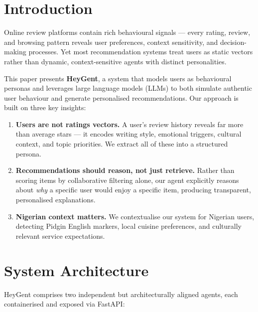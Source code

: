 \documentclass[11pt, a4paper]{article}
\begin{document}
\section{Introduction}

Online review platforms contain rich behavioural signals --- every rating, review, and browsing pattern reveals user preferences, context sensitivity, and decision-making processes. Yet most recommendation systems treat users as static vectors rather than dynamic, context-sensitive agents with distinct personalities.

This paper presents \textbf{HeyGent}, a system that models users as behavioural personas and leverages large language models (LLMs) to both simulate authentic user behaviour and generate personalised recommendations. Our approach is built on three key insights:

\begin{enumerate}[leftmargin=2em]
    \item \textbf{Users are not ratings vectors.} A user's review history reveals far more than average stars --- it encodes writing style, emotional triggers, cultural context, and topic priorities. We extract all of these into a structured persona.
    \item \textbf{Recommendations should reason, not just retrieve.} Rather than scoring items by collaborative filtering alone, our agent explicitly reasons about \emph{why} a specific user would enjoy a specific item, producing transparent, personalised explanations.
    \item \textbf{Nigerian context matters.} We contextualise our system for Nigerian users, detecting Pidgin English markers, local cuisine preferences, and culturally relevant service expectations.
\end{enumerate}

\section{System Architecture}

HeyGent comprises two independent but architecturally aligned agents, each containerised and exposed via FastAPI:
\end{document}
